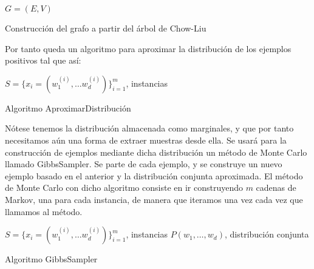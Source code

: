 \begin{algorithm}[H]
\begin{algorithmic}[1]
 \REQUIRE $G = (E,V)$
   \ELSE
   \ENDIF
 \ENDFOR
 \NEWLINE
\end{algorithmic}
\caption{Construcción del grafo a partir del árbol de Chow-Liu}
\label{alg:make-directed}
\end{algorithm}

Por tanto queda un algoritmo para aproximar la distribución de los ejemplos positivos tal que así:

\begin{algorithm}[H]
\begin{algorithmic}[1]
  \REQUIRE $S = \{x_i=(w_1^{(i)}, \ldots w_d^{(i)})\}_{i=1}^m$, instancias
  \ENDFOR
\end{algorithmic}
\caption{Algoritmo AproximarDistribución}
\label{alg:aproxdist}
\end{algorithm}

Nótese tenemos la distribución almacenada como marginales, y que por tanto necesitamos aún una forma de extraer
muestras desde ella. Se usará para la construcción de ejemplos mediante dicha distribución un método de Monte 
Carlo llamado GibbsSampler. Se parte de cada ejemplo, y se construye un nuevo ejemplo basado en el anterior y 
la distribución conjunta aproximada. El método de Monte Carlo con dicho algoritmo consiste en ir construyendo 
$m$ cadenas de Markov, una para cada instancia, de manera que iteramos una vez cada vez que llamamos al método.


\begin{algorithm}[H]
\begin{algorithmic}[1]
  \REQUIRE $S = \{x_i=(w_1^{(i)}, \ldots w_d^{(i)})\}_{i=1}^m$, instancias
  \REQUIRE $P(w_1, \ldots, w_d)$, distribución conjunta
    \ENDFOR
  \ENDFOR
\end{algorithmic}
\caption{Algoritmo GibbsSampler}
\label{alg:gibbs}
\end{algorithm}

